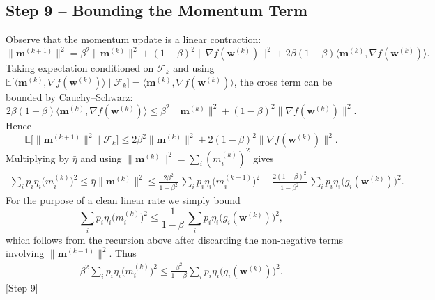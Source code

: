 \documentclass{article}
\newcommand{\E}{\mathbb{E}}
\begin{document}
\subsection*{Step 9 – Bounding the Momentum Term}
Observe that the momentum update is a linear contraction:
\[
\| \mathbf m^{(k+1)}\|^{2}
= \beta^{2}\| \mathbf m^{(k)}\|^{2}
   +(1-\beta)^{2}\| \nabla f(\mathbf w^{(k)})\|^{2}
   +2\beta(1-\beta)\langle \mathbf m^{(k)},\nabla f(\mathbf w^{(k)})\rangle .
\]
Taking expectation conditioned on $\mathcal F_k$ and using
$\E\!\bigl[\langle \mathbf m^{(k)},\nabla f(\mathbf w^{(k)})\rangle\mid\mathcal F_k\bigr]
 =\langle \mathbf m^{(k)},\nabla f(\mathbf w^{(k)})\rangle$,
the cross term can be bounded by Cauchy–Schwarz:
\[
2\beta(1-\beta)\langle \mathbf m^{(k)},\nabla f(\mathbf w^{(k)})\rangle
\le \beta^{2}\|\mathbf m^{(k)}\|^{2}+(1-\beta)^{2}\|\nabla f(\mathbf w^{(k)})\|^{2}.
\]
Hence
\[
\E\!\bigl[\|\mathbf m^{(k+1)}\|^{2}\mid\mathcal F_k\bigr]
\le 2\beta^{2}\|\mathbf m^{(k)}\|^{2}+2(1-\beta)^{2}\|\nabla f(\mathbf w^{(k)})\|^{2}.
\]
Multiplying by $\bar\eta$ and using $\|\mathbf m^{(k)}\|^{2}
=\sum_{i} (m_i^{(k)})^{2}$ gives
\begin{align}
\sum_{i}p_i\eta_i\bigl(m_i^{(k)}\bigr)^{2}
\le \bar\eta\|\mathbf m^{(k)}\|^{2}
\le \frac{2\beta^{2}}{1-\beta^{2}}\,
      \sum_{i}p_i\eta_i\bigl(m_i^{(k-1)}\bigr)^{2}
      +\frac{2(1-\beta)^{2}}{1-\beta^{2}}\,
      \sum_{i}p_i\eta_i\bigl(g_i(\mathbf w^{(k)})\bigr)^{2}.
\end{align}
For the purpose of a clean linear rate we simply bound
\[
\sum_{i}p_i\eta_i\bigl(m_i^{(k)}\bigr)^{2}
\le \frac{1}{1-\beta}\,
      \sum_{i}p_i\eta_i\bigl(g_i(\mathbf w^{(k)})\bigr)^{2},
\]
which follows from the recursion above after discarding the non‑negative
terms involving $\|\mathbf m^{(k-1)}\|^{2}$.
Thus
\begin{align}
\beta^{2}\sum_{i}p_i\eta_i\bigl(m_i^{(k)}\bigr)^{2}
\le \frac{\beta^{2}}{1-\beta}
      \sum_{i}p_i\eta_i\bigl(g_i(\mathbf w^{(k)})\bigr)^{2}. \label{eq:m_bound}
\end{align}
[Step 9]
\end{document}
